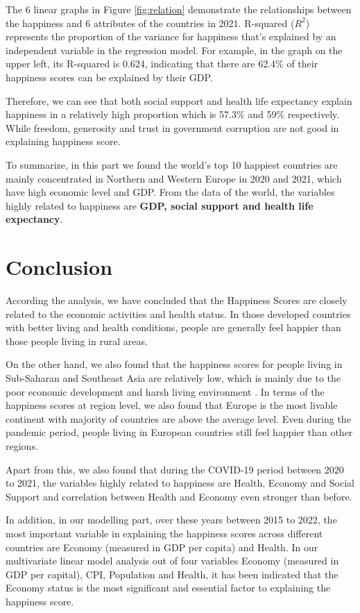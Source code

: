 \documentclass[11pt,a4paper,]{article}
\begin{document}
The 6 linear graphs in Figure \ref{fig:relation} demonstrate the relationships between the happiness and 6 attributes of the countries in 2021. R-squared (\(R^2\)) represents the proportion of the variance for happiness that's explained by an independent variable in the regression model. For example, in the graph on the upper left, its R-squared is 0.624, indicating that there are 62.4\% of their happiness scores can be explained by their GDP.

Therefore, we can see that both social support and health life expectancy explain happiness in a relatively high proportion which is 57.3\% and 59\% respectively. While freedom, generosity and trust in government corruption are not good in explaining happiness score.

To summarize, in this part we found the world's top 10 happiest countries are mainly concentrated in Northern and Western Europe in 2020 and 2021, which have high economic level and GDP. From the data of the world, the variables highly related to happiness are \textbf{GDP, social support and health life expectancy}.

\hypertarget{conclusion}{%
\section{Conclusion}\label{conclusion}}

According the analysis, we have concluded that the Happiness Scores are closely related to the economic activities and health status. In those developed countries with better living and health conditions, people are generally feel happier than those people living in rural areas.

On the other hand, we also found that the happiness scores for people living in Sub-Saharan and Southeast Asia are relatively low, which is mainly due to the poor economic development and harsh living environment \autocite{helliwell2021world}. In terms of the happiness scores at region level, we also found that Europe is the most livable continent with majority of countries are above the average level. Even during the pandemic period, people living in European countries still feel happier than other regions.

Apart from this, we also found that during the COVID-19 period between 2020 to 2021, the variables highly related to happiness are Health, Economy and Social Support and correlation between Health and Economy even stronger than before.

In addition, in our modelling part, over these years between 2015 to 2022, the most important variable in explaining the happiness scores across different countries are Economy (measured in GDP per capita) and Health. In our multivariate linear model analysis out of four variables Economy (measured in GDP per capital), CPI, Population and Health, it has been indicated that the Economy status is the most significant and essential factor to explaining the happiness score.
\end{document}
